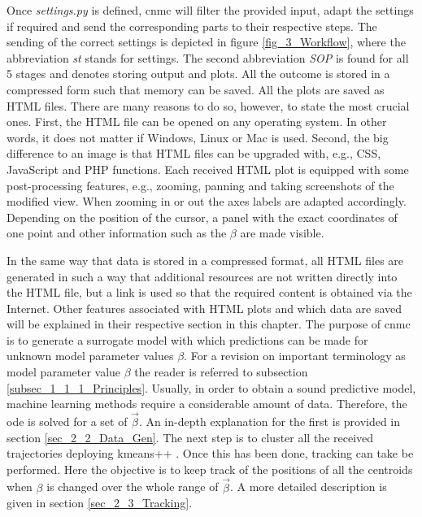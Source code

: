 Once \emph{settings.py} is defined, \gls{cnmc} will filter the provided input, adapt the settings if required and send the corresponding parts to their respective steps. 
The sending of the correct settings is depicted in figure \ref{fig_3_Workflow}, where the abbreviation \emph{st} stands for settings. 
The second abbreviation \emph{SOP} is found for all 5 stages and denotes storing output and plots. All the outcome is stored in a compressed form such that memory can be saved. All the plots are saved as HTML files. There are many reasons to do so, however, to state the most crucial ones. First, the HTML file can be opened on any operating system. 
In other words, it does not matter if Windows, Linux or Mac is used. 
Second, the big difference to an image is that HTML files can be upgraded with, e.g., CSS, JavaScript and PHP functions. 
Each received HTML plot is equipped with some post-processing features, e.g., zooming, panning and taking screenshots of the modified view. When zooming in or out the axes labels are adapted accordingly. Depending on the position of 
the cursor, a panel with the exact coordinates of one point and other information such as the $\beta $ are made visible. \newline 

In the same way that data is stored in a compressed format, all HTML files are generated in such a way that additional resources are not written directly into the HTML file, but a link is used so that the required content is obtained via the Internet.  
Other features associated with HTML plots and which data are saved will be explained in their respective section in this chapter. 
The purpose of \gls{cnmc} is to generate a surrogate model with which predictions can be made for unknown model parameter values ${\beta}$. 
For a revision on important terminology as model parameter value $\beta$
the reader is referred to subsection \ref{subsec_1_1_1_Principles}. 
Usually, in order to obtain a sound predictive model, machine learning methods require a considerable amount of data. Therefore, the \gls{ode} is solved for a set of $\vec{\beta }$. An in-depth explanation for the first is provided in 
section \ref{sec_2_2_Data_Gen}.
The next step is to cluster all the received trajectories deploying kmeans++ \cite{Arthur2006}. Once this has been done, tracking can take be performed.
Here the objective is to keep track of the positions of all the centroids when $\beta$ is changed over the whole range of $\vec{\beta }$.
A more detailed description is given in section \ref{sec_2_3_Tracking}.\newline 


